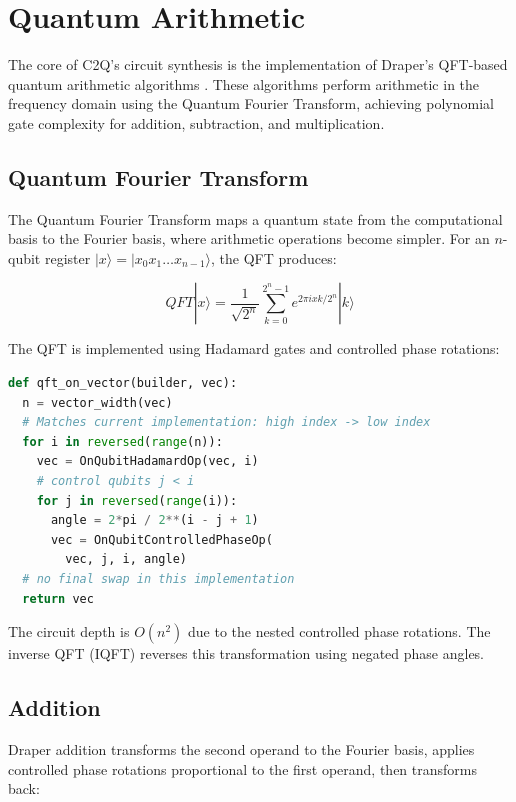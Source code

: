 \documentclass[a4paper,twocolumn]{article}
\begin{document}
\section{Quantum Arithmetic}

The core of C2Q's circuit synthesis is the implementation of Draper's QFT-based quantum arithmetic algorithms
\cite{draper2000addition}. These algorithms perform arithmetic in the frequency domain using the Quantum Fourier Transform,
achieving polynomial gate complexity for addition, subtraction, and multiplication.

\subsection{Quantum Fourier Transform}

The Quantum Fourier Transform maps a quantum state from the computational basis to the Fourier basis,
where arithmetic operations become simpler. For an $n$-qubit register $|x\rangle = |x_0 x_1 \ldots x_{n-1}\rangle$,
the QFT produces:

\begin{equation}
  QFT|x\rangle = \frac{1}{\sqrt{2^n}} \sum_{k=0}^{2^n-1} e^{2\pi i xk/2^n}|k\rangle
\end{equation}

The QFT is implemented using Hadamard gates and controlled phase rotations:

\begin{lstlisting}[language=Python, caption={QFT Implementation}]
def qft_on_vector(builder, vec):
  n = vector_width(vec)
  # Matches current implementation: high index -> low index
  for i in reversed(range(n)):
    vec = OnQubitHadamardOp(vec, i)
    # control qubits j < i
    for j in reversed(range(i)):
      angle = 2*pi / 2**(i - j + 1)
      vec = OnQubitControlledPhaseOp(
        vec, j, i, angle)
  # no final swap in this implementation
  return vec
\end{lstlisting}

The circuit depth is $O(n^2)$ due to the nested controlled phase rotations. The inverse QFT (IQFT) reverses this
transformation using negated phase angles.

\subsection{Addition}

Draper addition transforms the second operand to the Fourier basis, applies controlled phase rotations proportional
to the first operand, then transforms back:
\end{document}
